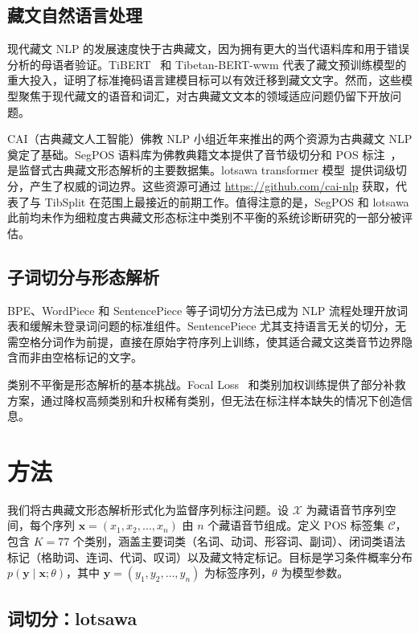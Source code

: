 \documentclass[11pt,a4paper]{article}
\begin{document}
\subsection{藏文自然语言处理}

现代藏文 NLP 的发展速度快于古典藏文，因为拥有更大的当代语料库和用于错误分析的母语者验证。TiBERT~\cite{tibert} 和 Tibetan-BERT-wwm 代表了藏文预训练模型的重大投入，证明了标准掩码语言建模目标可以有效迁移到藏文文字。然而，这些模型聚焦于现代藏文的语音和词汇，对古典藏文文本的领域适应问题仍留下开放问题。

CAI（古典藏文人工智能）佛教 NLP 小组近年来推出的两个资源为古典藏文 NLP 奠定了基础。SegPOS 语料库为佛教典籍文本提供了音节级切分和 POS 标注~\cite{segpos}，是监督式古典藏文形态解析的主要数据集。lotsawa transformer 模型~\cite{lotsawa}提供词级切分，产生了权威的词边界。这些资源可通过 \url{https://github.com/cai-nlp} 获取，代表了与 TibSplit 在范围上最接近的前期工作。值得注意的是，SegPOS 和 lotsawa 此前均未作为细粒度古典藏文形态标注中类别不平衡的系统诊断研究的一部分被评估。

\subsection{子词切分与形态解析}

BPE、WordPiece 和 SentencePiece 等子词切分方法已成为 NLP 流程处理开放词表和缓解未登录词问题的标准组件。SentencePiece 尤其支持语言无关的切分，无需空格分词作为前提，直接在原始字符序列上训练，使其适合藏文这类音节边界隐含而非由空格标记的文字。

类别不平衡是形态解析的基本挑战。Focal Loss~\cite{lin2017} 和类别加权训练提供了部分补救方案，通过降权高频类别和升权稀有类别，但无法在标注样本缺失的情况下创造信息。

\section{方法}

我们将古典藏文形态解析形式化为监督序列标注问题。设 $\mathcal{X}$ 为藏语音节序列空间，每个序列 $\mathbf{x} = (x_1, x_2, \ldots, x_n)$ 由 $n$ 个藏语音节组成。定义 POS 标签集 $\mathcal{C}$，包含 $K = 77$ 个类别，涵盖主要词类（名词、动词、形容词、副词）、闭词类语法标记（格助词、连词、代词、叹词）以及藏文特定标记。目标是学习条件概率分布 $p(\mathbf{y} \mid \mathbf{x}; \theta)$，其中 $\mathbf{y} = (y_1, y_2, \ldots, y_n)$ 为标签序列，$\theta$ 为模型参数。

\subsection{词切分：lotsawa}
\end{document}
